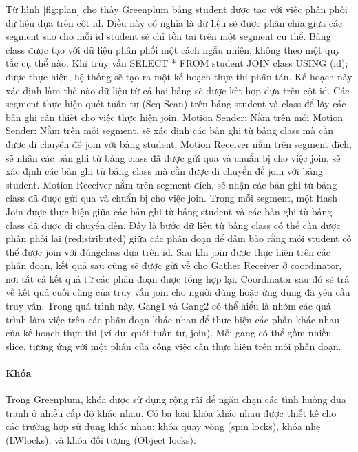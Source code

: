 \documentclass{article}[14pt]
\begin{document}
Từ hình \ref{fig:plan} cho thấy Greenplum bảng student được tạo với việc phân phối dữ liệu dựa trên cột id. Điều này có nghĩa là dữ liệu sẽ được phân chia giữa các segment sao cho mỗi id student sẽ chỉ tồn tại trên một segment cụ thể. Bảng class được tạo với dữ liệu phân phối một cách ngẫu nhiên, không theo một quy tắc cụ thể nào. Khi truy vấn SELECT * FROM student JOIN class USING (id); được thực hiện, hệ thống sẽ tạo ra một kế hoạch thực thi phân tán. Kế hoạch này xác định làm thế nào dữ liệu từ cả hai bảng sẽ được kết hợp dựa trên cột id. Các segment thực hiện quét tuần tự (Seq Scan) trên bảng student và class để lấy các bản ghi cần thiết cho việc thực hiện join. Motion Sender: Nằm trên mỗi Motion Sender: Nằm trên mỗi segment, sẽ xác định các bản ghi từ bảng
class mà cần được di chuyển để join với bảng student.
Motion Receiver nằm trên segment đích, sẽ nhận các bản ghi từ bảng class
đã được gửi qua và chuẩn bị cho việc join, sẽ xác định các bản ghi từ bảng class mà cần được di chuyển để join với bảng student. Motion Receiver nằm trên segment đích, sẽ nhận các bản ghi từ bảng class đã được gửi qua và chuẩn bị cho việc join. Trong mỗi segment, một Hash Join được thực hiện giữa các bản ghi từ bảng student và các bản ghi từ bảng class đã được di chuyển đến. Đây là bước dữ liệu từ bảng class có thể cần được phân phối lại (redistributed) giữa các phân đoạn để đảm bảo rằng mỗi student có thể được join với đúngclass dựa trên id. Sau khi join được thực hiện trên các phân đoạn, kết quả sau cùng sẽ được gửi về cho Gather Receiver ở coordinator, nơi tất cả kết quả từ các phân đoạn được tổng hợp lại. Coordinator sau đó sẽ trả về kết quả cuối cùng của truy vấn join cho người dùng hoặc ứng dụng đã yêu cầu truy vấn. Trong quá trình này, Gang1 và Gang2 có thể hiểu là nhóm các quá trình làm việc trên các phân đoạn khác nhau để thực hiện các phần khác nhau của kế hoạch thực thi (ví dụ: quét tuần tự, join). Mỗi gang có thể gồm nhiều slice, tương ứng với một phần của công việc cần thực hiện trên mỗi phân
đoạn.

\paragraph{Khóa}

Trong Greenplum, khóa được sử dụng rộng rãi để ngăn chặn các tình huống
đua tranh ở nhiều cấp độ khác nhau. Có ba loại khóa khác nhau được thiết kế cho các trường hợp sử dụng khác nhau: khóa quay vòng (spin locks), khóa nhẹ (LWlocks), và khóa đối tượng (Object locks).
\end{document}
